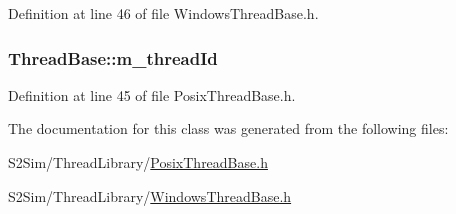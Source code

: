Definition at line 46 of file Windows\-Thread\-Base.\-h.

\hypertarget{class_thread_base_ae8574271bdcbfd80cbdde64c77bc7148}{
\subsubsection[{m\-\_\-thread\-Id}]{ Thread\-Base\-::m\-\_\-thread\-Id\hspace{0.3cm}{\ttfamily [private]}}}\label{class_thread_base_ae8574271bdcbfd80cbdde64c77bc7148}


Definition at line 45 of file Posix\-Thread\-Base.\-h.



The documentation for this class was generated from the following files\-:\begin{DoxyCompactItemize}
\item 
S2\-Sim/\-Thread\-Library/\hyperlink{_posix_thread_base_8h}{Posix\-Thread\-Base.\-h}\item 
S2\-Sim/\-Thread\-Library/\hyperlink{_windows_thread_base_8h}{Windows\-Thread\-Base.\-h}\end{DoxyCompactItemize}
